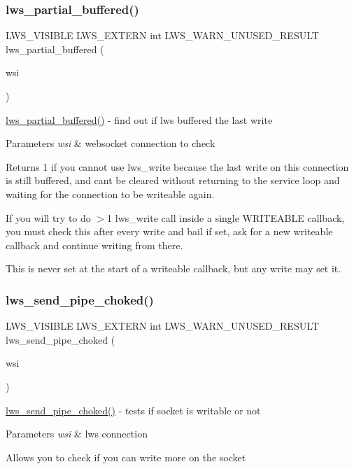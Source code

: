 \subsubsection{\texorpdfstring{lws\+\_\+partial\+\_\+buffered()}{lws\_partial\_buffered()}}
{\footnotesize\ttfamily L\+W\+S\+\_\+\+V\+I\+S\+I\+B\+LE L\+W\+S\+\_\+\+E\+X\+T\+E\+RN int L\+W\+S\+\_\+\+W\+A\+R\+N\+\_\+\+U\+N\+U\+S\+E\+D\+\_\+\+R\+E\+S\+U\+LT lws\+\_\+partial\+\_\+buffered (\begin{DoxyParamCaption}\item[{struct \hyperlink{structlws}{lws} $\ast$}]{wsi }\end{DoxyParamCaption})}

\hyperlink{group__wsstatus_gaeca4afc94b1f026034f99cbba37e2f85}{lws\+\_\+partial\+\_\+buffered()} -\/ find out if lws buffered the last write 
\begin{DoxyParams}{Parameters}
{\em wsi} & websocket connection to check\\
\hline
\end{DoxyParams}
Returns 1 if you cannot use lws\+\_\+write because the last write on this connection is still buffered, and can\textquotesingle{}t be cleared without returning to the service loop and waiting for the connection to be writeable again.

If you will try to do $>$1 lws\+\_\+write call inside a single W\+R\+I\+T\+E\+A\+B\+LE callback, you must check this after every write and bail if set, ask for a new writeable callback and continue writing from there.

This is never set at the start of a writeable callback, but any write may set it. \mbox{\label{group__wsstatus_ga2bb3655329b4651cd06f79ee3a764421}} 
\subsubsection{\texorpdfstring{lws\+\_\+send\+\_\+pipe\+\_\+choked()}{lws\_send\_pipe\_choked()}}
{\footnotesize\ttfamily L\+W\+S\+\_\+\+V\+I\+S\+I\+B\+LE L\+W\+S\+\_\+\+E\+X\+T\+E\+RN int L\+W\+S\+\_\+\+W\+A\+R\+N\+\_\+\+U\+N\+U\+S\+E\+D\+\_\+\+R\+E\+S\+U\+LT lws\+\_\+send\+\_\+pipe\+\_\+choked (\begin{DoxyParamCaption}\item[{struct \hyperlink{structlws}{lws} $\ast$}]{wsi }\end{DoxyParamCaption})}

\hyperlink{group__wsstatus_ga2bb3655329b4651cd06f79ee3a764421}{lws\+\_\+send\+\_\+pipe\+\_\+choked()} -\/ tests if socket is writable or not 
\begin{DoxyParams}{Parameters}
{\em wsi} & lws connection\\
\hline
\end{DoxyParams}
Allows you to check if you can write more on the socket 